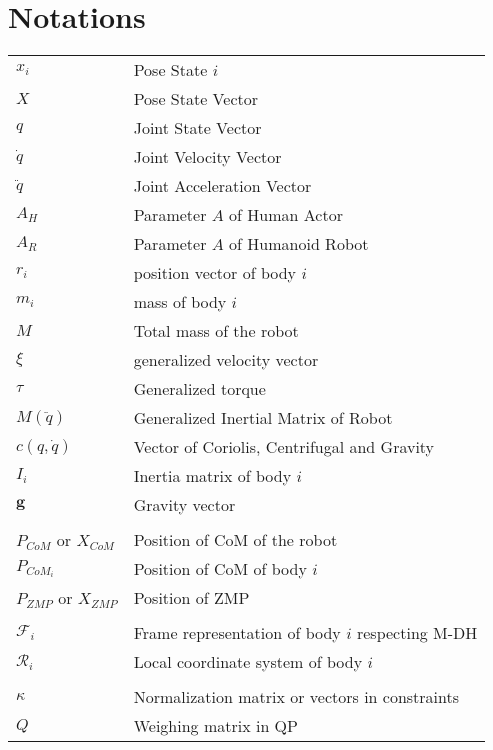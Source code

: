 \documentclass{thesisreport}
\begin{document}
\section*{Notations}
    \begin{tabular}{p{3cm}p{10cm}}
        $x_i$ & Pose State $i$ \\
        $X$ & Pose State Vector \\
        $q$ & Joint State Vector \\
        $\dot{q}$ & Joint Velocity Vector \\
        $\ddot{q}$ & Joint Acceleration Vector \\
        $A_H$ & Parameter $A$ of Human Actor \\
        $A_R$ & Parameter $A$ of Humanoid Robot \\
        $r_i$ & position vector of body $i$ \\
        $m_i$ & mass of body $i$ \\
        $M$ & Total mass of the robot \\
        $\xi$ & generalized velocity vector \\
        $\tau$ & Generalized torque \\
        $M(\ddot{q})$ & Generalized Inertial Matrix of Robot \\
        $c(q, \dot{q})$ & Vector of Coriolis, Centrifugal and Gravity \\
        $I_i$ & Inertia matrix of body $i$ \\
        $\mathbf{g}$ & Gravity vector \\
         & \\
        $P_{CoM}$ or $X_{CoM}$ & Position of CoM of the robot \\
        $P_{CoM_i}$ & Position of CoM of body $i$ \\
        $P_{ZMP}$ or $X_{ZMP}$ & Position of ZMP \\

        & \\

        $\mathcal{F}_i$ & Frame representation of body $i$ respecting M-DH \\
        $\mathcal{R}_i$ & Local coordinate system of body $i$ \\
        
        & \\
        $\kappa$ & Normalization matrix or vectors in constraints \\
        $Q$ & Weighing matrix in QP \\

    \end{tabular}
\end{document}
